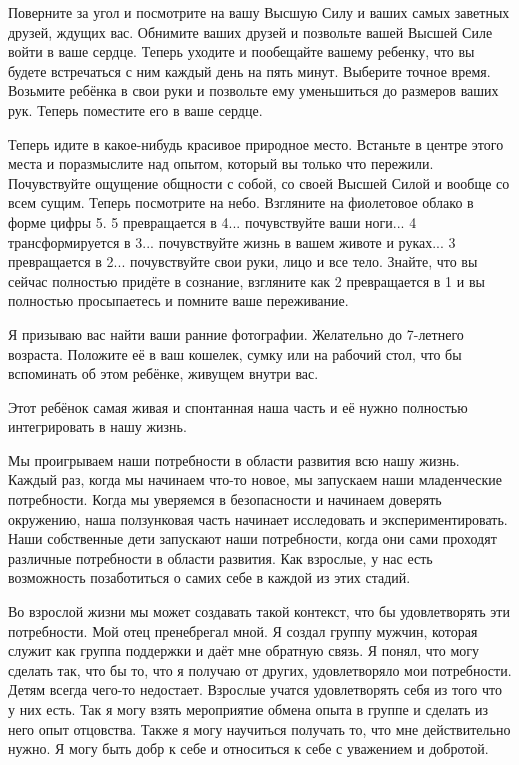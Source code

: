 \documentclass[10pt, fleqn]{article}
\begin{document}
Поверните за угол и посмотрите на вашу Высшую Силу и ваших самых заветных друзей, ждущих вас. Обнимите ваших друзей и позвольте вашей Высшей Силе войти в ваше сердце. Теперь уходите и пообещайте вашему ребенку, что вы будете встречаться с ним каждый день на пять минут. Выберите точное время. Возьмите ребёнка в свои руки и позвольте ему уменьшиться до размеров ваших рук. Теперь поместите его в ваше сердце.

Теперь идите в какое-нибудь красивое природное место. Встаньте в центре этого места и поразмыслите над опытом, который вы только что пережили. Почувствуйте ощущение общности с собой, со своей Высшей Силой и вообще со всем сущим. Теперь посмотрите на небо. Взгляните на фиолетовое облако в форме цифры 5. 5 превращается в 4... почувствуйте ваши ноги... 4 трансформируется в 3... почувствуйте жизнь в вашем животе и руках... 3 превращается в 2... почувствуйте свои руки, лицо и все тело. Знайте, что вы сейчас полностью придёте в сознание, взгляните как 2 превращается в 1 и вы полностью просыпаетесь и помните ваше переживание.

Я призываю вас найти ваши ранние фотографии. Желательно до 7-летнего возраста. Положите её в ваш кошелек, сумку или на рабочий стол, что бы вспоминать об этом ребёнке, живущем внутри вас.

Этот ребёнок самая живая и спонтанная наша часть и её нужно полностью интегрировать в нашу жизнь.



Мы проигрываем наши потребности в области развития всю нашу жизнь. Каждый раз, когда мы начинаем что-то новое, мы запускаем наши младенческие потребности. Когда мы уверяемся в безопасности и начинаем доверять окружению, наша ползунковая часть начинает исследовать и экспериментировать. Наши собственные дети запускают наши потребности, когда они сами проходят различные потребности в области развития. Как взрослые, у нас есть возможность позаботиться о самих себе в каждой из этих стадий.

Во взрослой жизни мы может создавать такой контекст, что бы удовлетворять эти потребности. Мой отец пренебрегал мной. Я создал группу мужчин, которая служит как группа поддержки и даёт мне обратную связь. Я понял, что могу сделать так, что бы то, что я получаю от других, удовлетворяло мои потребности. Детям всегда чего-то недостает. Взрослые учатся удовлетворять себя из того что у них есть. Так я могу взять мероприятие обмена опыта в группе и сделать из него опыт отцовства. Также я могу научиться получать то, что мне действительно нужно. Я могу быть добр к себе и относиться к себе с уважением и добротой.
\end{document}
